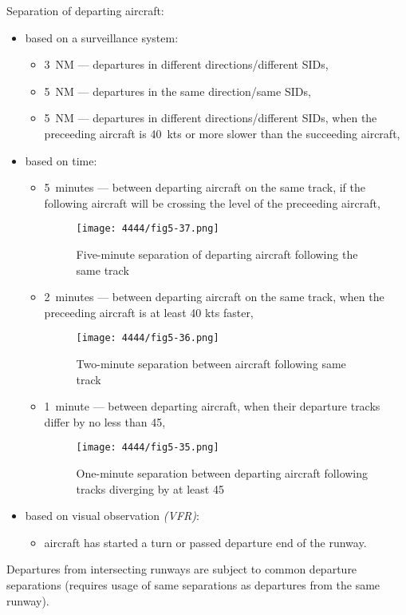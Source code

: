 \clearpage
Separation of departing aircraft:
\begin{itemize}
    \item based on a surveillance system:
    \begin{itemize}
        \item 3~NM --- departures in different directions/different SIDs,
        \item 5~NM --- departures in the same direction/same SIDs,
        \item 5~NM --- departures in different directions/different SIDs, when the preceeding aircraft is 40~kts or more slower than the succeeding aircraft,
    \end{itemize}
    \item based on time:
    \begin{itemize}
        \item 5~minutes --- between departing aircraft on the same track, if the following aircraft will be crossing the level of the preceeding aircraft,
        \begin{figure}[htbp]
            \centering
            \texttt{[image: 4444/fig5-37.png]}
            \caption{Five-minute separation of departing aircraft following the same track~\cite{4444}}
            \label{fig:5min_departures}
        \end{figure}
        \item 2~minutes --- between departing aircraft on the same track, when the preceeding aircraft is at least 40 kts faster,
        \begin{figure}[htbp]
            \centering
            \texttt{[image: 4444/fig5-36.png]}
            \caption{Two-minute separation between aircraft following same track~\cite{4444}}
            \label{fig:2min_departures}
        \end{figure}
        \item 1~minute --- between departing aircraft, when their departure tracks differ by no less than 45\degree ,
        \begin{figure}[htbp]
            \centering
            \texttt{[image: 4444/fig5-35.png]}
            \caption{One-minute separation between departing aircraft following tracks diverging by at least 45\degree~\cite{4444}}
            \label{fig:1min_departures}
        \end{figure}
    \end{itemize}
    \item based on visual observation \emph{(VFR)}:
    \begin{itemize}
        \item aircraft has started a turn or passed departure end of the runway.
    \end{itemize}
\end{itemize}

Departures from intersecting runways are subject to common departure separations (requires usage of same separations as departures from the same runway).